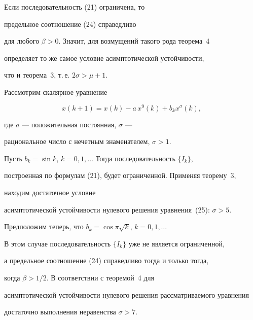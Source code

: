 \begin{note}


Если последовательность (21) ограничена, то


предельное соотношение (24) справедливо


для любого $\beta>0$. Значит, для возмущений такого рода теорема~4 


определяет то же самое условие асимптотической устойчивости,


что и теорема~3, т.\,е. $2\sigma>\mu+1$.


\end{note}





\begin{exam}


Рассмотрим скалярное уравнение


\begin{equation}


x(k+1)=x(k)-a\, x^9(k)+b_k x^\sigma(k),


\end{equation}


где $a$ --- положительная постоянная, $\sigma$ --- 


рациональное число с нечетным знаменателем, $\sigma>1$.





Пусть $b_k=\sin k$, $k=0,1,\dotsc$ Тогда последовательность $\{I_k\}$, 


построенная по формулам (21), будет ограниченной. Применяя теорему~3, 


находим достаточное условие


асимптотической устойчивости нулевого решения уравнения~(25): $\sigma>5$.





Предположим теперь, что $b_k=\cos\pi \sqrt{k}$, $k=0,1,\dotsc$


В этом случае последовательность $\{I_k\}$ уже не является ограниченной, 


а предельное соотношение (24) справедливо тогда и только тогда, 


когда $\beta>1/2$. В соответствии с теоремой~4 для 


асимптотической устойчивости нулевого решения рассматриваемого уравнения 


достаточно выполнения неравенства $\sigma>7$.


\end{exam}








